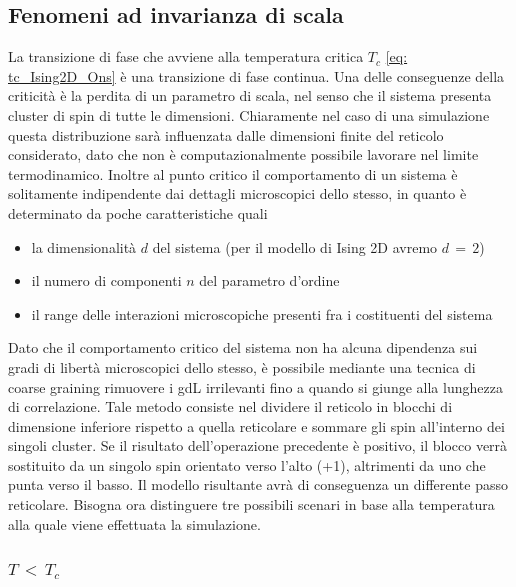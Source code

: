 \subsection{Fenomeni ad invarianza di scala}

La transizione di fase che avviene alla temperatura critica $T_c$ \eqref{eq: tc_Ising2D_Ons} è una transizione di fase continua. Una delle 
conseguenze della criticità è la perdita di un parametro di scala, nel senso che il sistema presenta cluster di spin di tutte le dimensioni. 
Chiaramente nel caso di una simulazione questa distribuzione sarà influenzata dalle dimensioni finite del reticolo considerato, dato che 
non è computazionalmente possibile lavorare nel limite termodinamico. Inoltre al punto critico il comportamento di un sistema è 
solitamente indipendente dai dettagli microscopici dello stesso, in quanto è determinato da poche caratteristiche quali

\begin{itemize}[label=$\diamond$] 
    \item la dimensionalità $d$ del sistema (per il modello di Ising 2D avremo $d\,=\,2$)
    \item il numero di componenti $n$ del parametro d'ordine
    \item il range delle interazioni microscopiche presenti fra i costituenti del sistema
\end{itemize}

Dato che il comportamento critico del sistema non ha alcuna dipendenza sui gradi di libertà microscopici dello stesso, è possibile mediante 
una tecnica di coarse graining rimuovere i gdL irrilevanti fino a quando si giunge alla lunghezza di correlazione. Tale metodo consiste 
nel dividere il reticolo in blocchi di dimensione inferiore rispetto a quella reticolare e sommare gli spin all'interno dei singoli cluster. 
Se il risultato dell'operazione precedente è positivo, il blocco verrà sostituito da un singolo spin orientato verso l'alto (+1), 
altrimenti da uno che punta verso il basso. Il modello risultante avrà di conseguenza un differente passo reticolare. Bisogna ora  
distinguere tre possibili scenari in base alla temperatura alla quale viene effettuata la simulazione.



\subsubsection{$T\,<\,T_c$}

